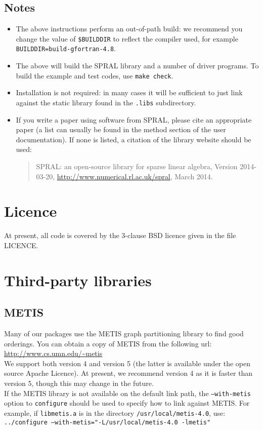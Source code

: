 \subsection*{Notes}
\begin{itemize}
   \item The above instructions perform an out-of-path build: we recommend you
      change the value of \texttt{\$BUILDDIR} to reflect the compiler used, for
      example \texttt{BUILDDIR=build-gfortran-4.8}.
   \item The above will build the SPRAL library and a number of driver programs.
      To build the example and test codes, use \texttt{make check}.
   \item Installation is not required: in many cases it will be sufficient to
      just link against the static library found in the \texttt{.libs}
      subdirectory.
   \item If you write a paper using software from SPRAL, please cite an
      appropriate paper (a list can usually be found in the method section of
      the user documentation). If none is listed, a citation of the library
      website should be used:
      \begin{quote}
         SPRAL: an open-source library for sparse linear algebra, Version 2014-03-20, \url{http://www.numerical.rl.ac.uk/spral}, March 2014.
      \end{quote}
\end{itemize}

\section{Licence}
At present, all code is covered by the 3-clause BSD licence given in the file
LICENCE.

\section{Third-party libraries}
\subsection{METIS}
Many of our packages use the METIS graph partitioning library to find good
orderings. You can obtain a copy of METIS from the following url:\\
\url{http://www.cs.umn.edu/~metis}\\
We support both version 4 and version 5 (the latter is available under the open
source Apache Licence). At present, we recommend version 4 as it is faster than
version 5, though this may change in the future.\\
If the METIS library is not available on the default link path, the
\texttt{--with-metis} option to \texttt{configure} should be used to specify
how to link against METIS. For example, if \texttt{libmetis.a} is in the directory \texttt{/usr/local/metis-4.0}, use: \\
\texttt{../configure --with-metis="-L/usr/local/metis-4.0 -lmetis"}

